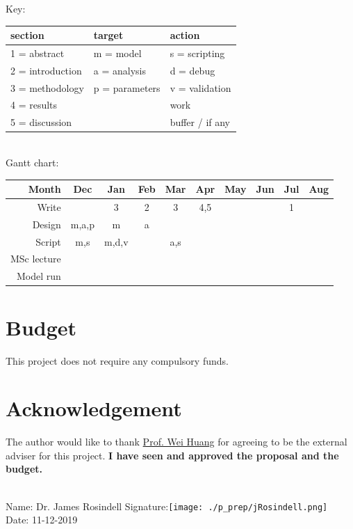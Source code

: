 \documentclass[a4paper, 11pt]{article}
\begin{document}
Key:
\begin{tabular}{lll}
	section & target & action\\\hline
	1 = abstract & m = model & s = scripting\\
	2 = introduction & a = analysis & d = debug\\
	3 = methodology & p = parameters & v = validation\\
	4 = results && \cellcolor{grey90}work\\
	5 = discussion && \cellcolor{lorange}buffer / if any\\
\end{tabular}\\
Gantt chart:
\begin{tabular}{r|ccccccccc}
	Month		&Dec						&Jan						&Feb					&Mar					&Apr					&May				&Jun					&Jul					&Aug				\\\hline
	Write		&							&\cellcolor{grey90}3		&\cellcolor{grey90}2	&\cellcolor{lorange}3	&\cellcolor{grey90}4,5	&\cellcolor{grey90}	&\cellcolor{grey90}		&\cellcolor{grey90}1	&\cellcolor{lorange}\\
	Design		&\cellcolor{grey90}m,a,p	&\cellcolor{grey90}m		&\cellcolor{grey90}a	&\cellcolor{lorange}	&						&					&						&						&					\\
	Script		&\cellcolor{grey90}m,s		&\cellcolor{grey90}m,d,v	&						&\cellcolor{grey90}a,s	&\cellcolor{grey90}		&\cellcolor{grey90}	&\cellcolor{lorange}	&						&					\\
	MSc lecture	&\cellcolor{lorange}		&\cellcolor{lorange}		&\cellcolor{lorange}	&\cellcolor{lorange}	&						&					&						&						&					\\
	Model run 	&							&\cellcolor{grey90}			&\cellcolor{grey90}		&\cellcolor{grey90}		&\cellcolor{grey90}		&\cellcolor{grey90}	&\cellcolor{lorange}	&\cellcolor{lorange}	&\cellcolor{lorange}\\
\end{tabular}
\section{Budget}
This project does not require any compulsory funds.
\clearpage
\section*{Acknowledgement}
The author would like to thank \href{mailto:wei.huang@eng.ox.ac.uk}{Prof. Wei Huang} for agreeing to be the external adviser for this project.
\nocite{*}\printbibliography
\clearpage
\textbf{I have seen and approved the proposal and the budget.}\\\\
\begin{Large}
	Name: Dr. James Rosindell \hspace{2cm} Signature:\texttt{[image: ./p\_prep/jRosindell.png]}\\
	Date: 11-12-2019
\end{Large}
\end{document}
